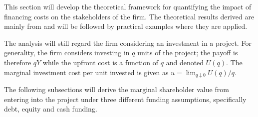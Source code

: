 \documentclass[../main.tex]{subfiles}
\begin{document}
    This section will develop the theoretical framework for quantifying the impact of financing costs on the stakeholders of the firm.
    The theoretical results derived are mainly from \textcite{ADS2019} and will be followed by practical examples where they are applied.


    The analysis will still regard the firm considering an investment in a project.
    For generality, the firm considers investing in $q$ units of the project; 
    the payoff is therefore $qY$ while the upfront cost is a function of $q$ and denoted $U(q)$. 
    The marginal investment cost per unit invested is given as 
    $u = \lim_{q\downarrow 0} U(q) / q$.

    The following subsections will derive the marginal shareholder value from entering into the project
    under three different funding assumptions, specifically debt, equity and cash funding.
\end{document}
